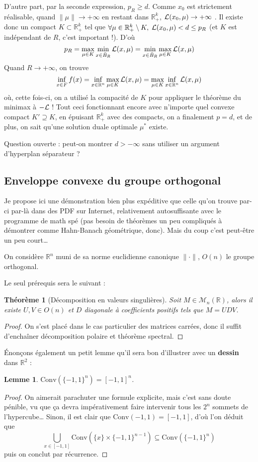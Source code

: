 \documentclass[a4paper, 11pt]{article}
\def\R{\mathbb{R}}
\def\L{{\cal{L}}}
\def\M{\mathcal{M}}
\newtheorem*{theorem}{Théorème}
\newtheorem*{lemma}{Lemme}
\begin{document}
D'autre part, par la seconde expression, $p_R \geq d$. Comme $x_0$ est
strictement réalisable, quand $\|\mu\| \to +\infty$ en restant dans $\R_+^k$,
$\L(x_0, \mu) \to +\infty$ . Il existe donc un compact $K \subset \R_+^k$ tel
que $\forall \mu \in \R_+^k \setminus K,\; \L(x_0, \mu) < d \leq p_R$ (et $K$
est indépendant de $R$, c'est important !). D'où
\[ p_R = \max_{\mu \in K} \min_{x \in \bar{B}_R} \L(x,\mu) =
  \min_{x \in \bar{B}_R} \max_{\mu \in K} \L(x,\mu) \]
Quand $R \to +\infty$, on trouve
\[ \inf_{x \in F} f(x) = \inf_{x \in \R^n} \max_{\mu \in K} \L(x,\mu) 
  = \max_{\mu \in K} \inf_{x \in \R^n} \L(x,\mu)  \]
où, cette fois-ci, on a utilisé la compacité de $K$ pour appliquer le théorème
du minimax à $-\L$ ! Tout ceci fonctionnant encore avec n'importe quel convexe
compact $K' \supseteq K$, en épuisant $\R_+^k$ avec des compacts, on a
finalement $p = d$, et de plus, on sait qu'une solution duale optimale $\mu^*$
existe.

Question ouverte : peut-on montrer $d > -\infty$ sans utiliser un argument
d'hyperplan séparateur ?


\newpage

\subsection{Enveloppe convexe du groupe orthogonal}

Je propose ici une démonstration bien plus expéditive que celle qu'on trouve
par-ci par-là dans des PDF sur Internet, relativement autosuffisante avec le
programme de math spé (pas besoin de théorèmes un peu compliqués à démontrer
comme Hahn-Banach géométrique, donc). Mais du coup c'est peut-être un peu court…

On considère $\R^n$ muni de sa norme euclidienne canonique $\|\cdot\|$, $O(n)$
le groupe orthogonal.

Le seul prérequis sera le suivant :

\begin{theorem}[Décomposition en valeurs singulières]
  Soit $M \in \M_n(\R)$, alors il existe $U, V \in O(n)$ et $D$ diagonale à
  coefficients positifs tels que $M = UDV$.
\end{theorem}
\begin{proof}
  On s'est placé dans le cas particulier des matrices carrées, donc il suffit
  d'enchaîner décomposition polaire et théorème spectral.
\end{proof}

Énonçons également un petit lemme qu'il sera bon d'illustrer avec un
\textbf{dessin} dans $\R^2$ :
\begin{lemma}
  $\mathrm{Conv}(\{-1,1\}^n) = [-1,1]^n$.
\end{lemma}
\begin{proof}
  On aimerait parachuter une formule explicite, mais c'est sans doute pénible,
  vu que ça devra impérativement faire intervenir tous les $2^n$ sommets de
  l'hypercube… Sinon, il est clair que $\mathrm{Conv}({-1,1}) = [-1,1]$, d'où
  l'on déduit que
  \[ \bigcup_{x \in [-1,1]}
  \mathrm{Conv}(\{x\} \times \{-1,1\}^{n-1}) \subseteq
  \mathrm{Conv}(\{-1,1\}^n) \]
  puis on conclut par récurrence.
\end{proof}
\end{document}

